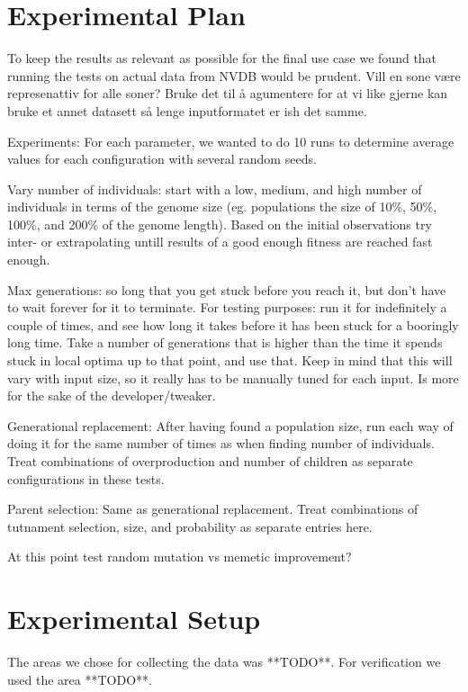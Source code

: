 \section{Experimental Plan} %
\label{sec:experimental_plan}
To keep the results as relevant as possible for the final use case we found that running the tests on actual data from NVDB would be prudent. Vill en sone være represenattiv for alle soner? Bruke det til å agumentere for at vi like gjerne kan bruke et annet datasett så lenge inputformatet er ish det samme.

Experiments:
For each parameter, we wanted to do 10 runs to determine average values for each configuration with several random seeds. 

Vary number of individuals: start with a low, medium, and high number of individuals in terms of the genome size (eg. populations the size of 10\%, 50\%, 100\%, and 200\% of the genome length). Based on the initial observations try inter- or extrapolating untill results of a good enough fitness are reached fast enough.

Max generations: so long that you get stuck before you reach it, but don't have to wait forever for it to terminate. For testing purposes: run it for indefinitely a couple of times, and see how long it takes before it has been stuck for a booringly long time. Take a number of generations that is higher than the time it spends stuck in local optima up to that point, and use that.
Keep in mind that this will vary with input size, so it really has to be manually tuned for each input. Is more for the sake of the developer/tweaker.

Generational replacement: After having found a population size, run each way of doing it for the same number of times as when finding number of individuals. Treat combinations of overproduction and number of children as separate configurations in these tests.

Parent selection: Same as generational replacement. Treat combinations of tutnament selection, size, and probability as separate entries here.

At this point test random mutation vs memetic improvement?

\section{Experimental Setup} %
\label{sec:experimental_setup}
The areas we chose for collecting the data was **TODO**. For verification we used the area **TODO**.

